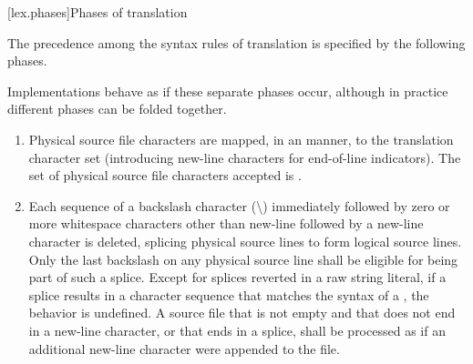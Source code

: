 [lex.phases]{Phases of translation}%

\pnum
{}%
The precedence among the syntax rules of translation is specified by the
following phases.
\begin{footnote}
Implementations behave as if these separate phases
occur, although in practice different phases can be folded together.
\end{footnote}

\begin{enumerate}
\item
{}%
%
Physical source file characters are mapped, in an
 manner,
to the translation character set
(introducing new-line characters for end-of-line indicators).
The set of physical source file characters accepted is .
\item
{}%
Each sequence of a backslash character (\textbackslash)
immediately followed by
zero or more whitespace characters other than new-line followed by
a new-line character is deleted, splicing
physical source lines to form logical source lines. Only the last
backslash on any physical source line shall be eligible for being part
of such a splice.
Except for splices reverted in a raw string literal, if a splice results in
a character sequence that matches the
syntax of a , the behavior is
undefined. A source file that is not empty and that does not end in a new-line
character, or that ends in a splice,
shall be processed as if an additional new-line character were appended
to the file.


\end{enumerate}
